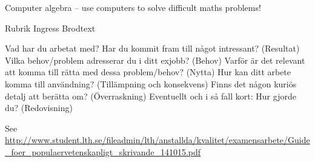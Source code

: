 Computer algebra -- use computers to solve difficult maths problems!



Rubrik
Ingress
Brodtext

Vad har du arbetat med? Har du kommit fram till något intressant? (Resultat)
Vilka behov/problem adresserar du i ditt exjobb? (Behov)
Varför är det relevant att komma till rätta med dessa problem/behov? (Nytta)
Hur kan ditt arbete komma till användning? (Tillämpning och konsekvens)
Finns det någon kuriös detalj att berätta om? (Överraskning)
Eventuellt och i så fall kort: Hur gjorde du? (Redovisning)

See \url{http://www.student.lth.se/fileadmin/lth/anstallda/kvalitet/examensarbete/Guide_foer_populaervetenskapligt_skrivande_141015.pdf}

